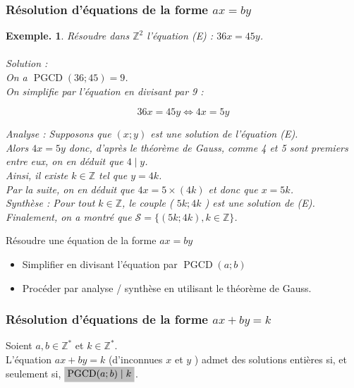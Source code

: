 \documentclass[12pt]{article}
\newcommand{\hideM}[1]{\mbox{\vphantom{$#1$}\smash{\colorbox{gray!50}{$\displaystyle #1$}}} }
\theoremstyle{break}
\newtheorem*{example}{Exemple.}
\begin{document}
\subsubsection{Résolution d'équations de la forme $a x=b y$}
\begin{example}
Résoudre dans $\mathbb{Z}^{2}$ l'équation (E) : $36 x=45 y$.\\
~\\Solution :\\
On a $\operatorname{PGCD}(36 ; 45)=9$.\\
On simplifie par l'équation en divisant par 9 :

$$
36 x=45 y \Longleftrightarrow 4 x=5 y
$$

Analyse : Supposons que $(x ; y)$ est une solution de l'équation (E).\\
Alors $4 x=5 y$ donc, d'après le théorème de Gauss, comme 4 et 5 sont premiers entre eux, on en déduit que $4 \mid y$.\\
Ainsi, il existe $k \in \mathbb{Z}$ tel que $y=4 k$.\\
Par la suite, on en déduit que $4 x=5 \times(4 k)$ et donc que $x=5 k$.\\
Synthèse : Pour tout $k \in \mathbb{Z}$, le couple ( $5 k ; 4 k$ ) est une solution de (E).\\
Finalement, on a montré que $\mathcal{S}=\{(5 k ; 4 k), k \in \mathbb{Z}\}$.
\end{example}

\begin{method}{Résoudre une équation de la forme $a x=b y$}{}
\begin{itemize}[noitemsep,topsep=0pt]
  \item Simplifier en divisant l'équation par $\operatorname{PGCD}(a ; b)$
  \item Procéder par analyse / synthèse en utilisant le théorème de Gauss.
\end{itemize}
\end{method}

\subsubsection{Résolution d'équations de la forme $a x+b y=k$}
\begin{proposition}{}{}
Soient $a, b \in \mathbb{Z}^{*}$ et $k \in \mathbb{Z}^{*}$.\\
L'équation $a x+b y=k$ (d'inconnues $x$ et $y$ ) admet des solutions entières si, et seulement si, $\hideM{\operatorname{PGCD}(a ; b) \mid k}$.
\end{proposition}
\end{document}
